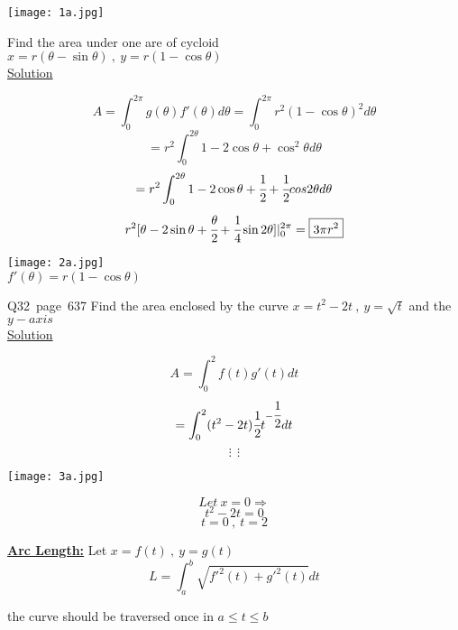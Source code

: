 \begin{minipage}{0.5\textwidth}
\texttt{[image: 1a.jpg]}
\end{minipage}
\noindent{\color{smalt(darkpowderblue)}\rule{\linewidth}{.2mm}}
\begin{example}
Find the area under one are of cycloid \\
$x=r(\theta-\sin\theta)~,~y=r(1-\cos\theta)$\\
\underline{\color{smalt(darkpowderblue)}Solution}\\
\begin{minipage}{0.6\textwidth}
$$A=\int_0^{2\pi}g(\theta)f'(\theta)d\theta=\int_0^{2\pi}r^2(1-\cos\theta)^2d\theta$$
$$=r^2\int_0^{2\theta}1-2\cos\theta+\cos^2\theta d\theta$$
$$=r^2\int_0^{2\theta}1-2\cos\theta+\cfrac{1}{2}+\cfrac{1}{2}cos2\theta d\theta$$
$$r^2[\theta-2\sin\theta+\cfrac{\theta}{2}+\cfrac{1}{4}\sin2\theta]|_0^{2\pi}=\boxed{3\pi r^2}$$
\end{minipage}
\begin{minipage}{0.6\textwidth}
\texttt{[image: 2a.jpg]}\\
$\boxed{f'(\theta)=r(1-\cos\theta)}$
\end{minipage}
\end{example}
\begin{exercise}
Q32~page~637 Find the area enclosed by the curve $x=t^2-2t~,~y=\sqrt{t}$ and the $y-axis$\\
\underline{\color{smalt(darkpowderblue)}Solution} \\
\begin{minipage}{0.34\textwidth}
$$A=\int_0^2 f(t)g'(t)dt$$
$$=\int_0^2 (t^2-2t)\cfrac{1}{2}t^{-\cfrac{1}{2}}dt$$
$$\vdots~~\vdots$$
\end{minipage}
\begin{minipage}{0.34\textwidth}
\texttt{[image: 3a.jpg]}
\end{minipage}
\begin{minipage}{0.34\textwidth}
$$Let~x=0\Rightarrow$$
$$t^2-2t=0$$
$$t=0~,~t=2$$
\end{minipage}
\end{exercise}
\textbf{\color{smalt(darkpowderblue)}\large \underline{Arc Length:}}
Let $x=f(t)~,~y=g(t)$
$$L=\int_a^b\sqrt{f'^2(t)+g'^2(t)}dt$$
\begin{remark}
the curve should be traversed once in $a\leq t\leq b$
\end{remark}
